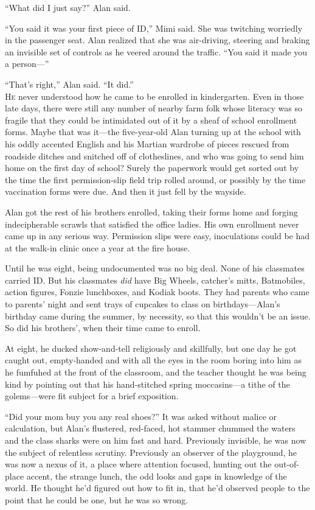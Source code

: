 ``What did I just say?'' Alan said.

``You said it was your first piece of ID,'' Mimi said.  She was
twitching worriedly in the passenger seat.  Alan realized that she was
air-driving, steering and braking an invisible set of controls as he
veered around the traffic.  ``You said it made you a person---''

``That's right,'' Alan said.  ``It did.''
\\
\lettrine[lines=3, lhang=.5, nindent=0pt, findent=2pt]{H}{e} never understood how he came to be enrolled in kindergarten.  Even
in those late days, there were still any number of nearby farm folk
whose literacy was so fragile that they could be intimidated out of it
by a sheaf of school enrollment forms.  Maybe that was it---the
five-year-old Alan turning up at the school with his oddly accented
English and his Martian wardrobe of pieces rescued from roadside
ditches and snitched off of clotheslines, and who was going to send
him home on the first day of school?  Surely the paperwork would get
sorted out by the time the first permission-slip field trip rolled
around, or possibly by the time vaccination forms were due.  And then
it just fell by the wayside.

Alan got the rest of his brothers enrolled, taking their forms home
and forging indecipherable scrawls that satisfied the office ladies. 
His own enrollment never came up in any serious way.  Permission slips
were easy, inoculations could be had at the walk-in clinic once a year
at the fire house.

Until he was eight, being undocumented was no big deal.  None of his
classmates carried ID.  But his classmates \textit{did} have Big
Wheels, catcher's mitts, Batmobiles, action figures, Fonzie
lunchboxes, and Kodiak boots.  They had parents who came to parents'
night and sent trays of cupcakes to class on birthdays---Alan's
birthday came during the summer, by necessity, so that this wouldn't
be an issue.  So did his brothers', when their time came to enroll.

At eight, he ducked show-and-tell religiously and skillfully, but one
day he got caught out, empty-handed and with all the eyes in the room
boring into him as he fumfuhed at the front of the classroom, and the
teacher thought he was being kind by pointing out that his
hand-stitched spring moccasins---a tithe of the golems---were fit
subject for a brief exposition.

``Did your mom buy you any real shoes?'' It was asked without malice
or calculation, but Alan's flustered, red-faced, hot stammer chummed
the waters and the class sharks were on him fast and hard.  Previously
invisible, he was now the subject of relentless scrutiny.  Previously
an observer of the playground, he was now a nexus of it, a place where
attention focused, hunting out the out-of-place accent, the strange
lunch, the odd looks and gaps in knowledge of the world.  He thought
he'd figured out how to fit in, that he'd observed people to the point
that he could be one, but he was so wrong.

